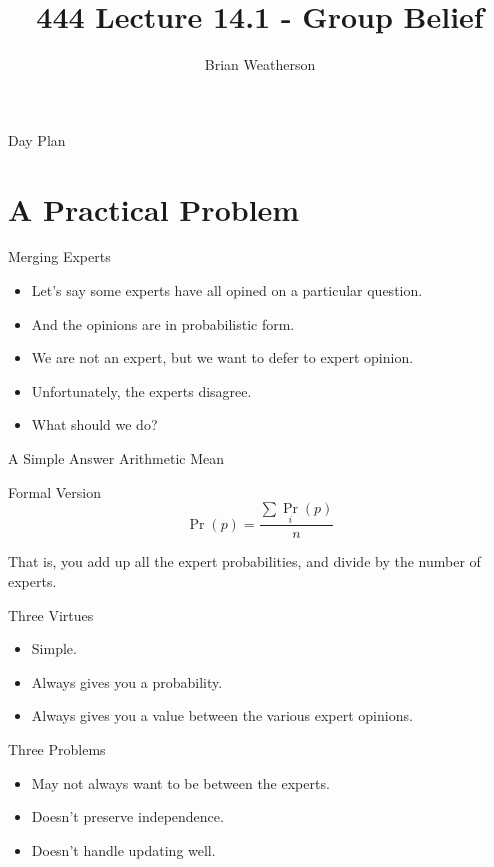 \documentclass[
  ignorenonframetext,
]{beamer}
\title{444 Lecture 14.1 - Group Belief}
\author{Brian Weatherson}
\date{}
\providecommand{\tightlist}{%
  \setlength{\itemsep}{0pt}\setlength{\parskip}{0pt}}
\begin{document}
\frame{\titlepage}

\begin{frame}{Day Plan}
\protect\hypertarget{day-plan}{}
\tableofcontents
\end{frame}

\hypertarget{a-practical-problem}{%
\section{A Practical Problem}\label{a-practical-problem}}

\begin{frame}{Merging Experts}
\protect\hypertarget{merging-experts}{}
\begin{itemize}
\tightlist
\item
  Let's say some experts have all opined on a particular question.
\item
  And the opinions are in probabilistic form.
\item
  We are not an expert, but we want to defer to expert opinion.
\item
  Unfortunately, the experts disagree.
\item
  What should we do?
\end{itemize}
\end{frame}

\begin{frame}{A Simple Answer}
\protect\hypertarget{a-simple-answer}{}
Arithmetic Mean
\end{frame}

\begin{frame}{Formal Version}
\protect\hypertarget{formal-version}{}
\[
\Pr(p) = \frac {\sum {\Pr_i(p)}}{n}
\]

That is, you add up all the expert probabilities, and divide by the
number of experts.
\end{frame}

\begin{frame}{Three Virtues}
\protect\hypertarget{three-virtues}{}
\begin{itemize}
\tightlist
\item
  Simple.
\item
  Always gives you a probability.
\item
  Always gives you a value between the various expert opinions.
\end{itemize}
\end{frame}

\begin{frame}{Three Problems}
\protect\hypertarget{three-problems}{}
\begin{itemize}
\tightlist
\item
  May not always want to be between the experts.
\item
  Doesn't preserve independence.
\item
  Doesn't handle updating well.
\end{itemize}
\end{frame}
\end{document}
